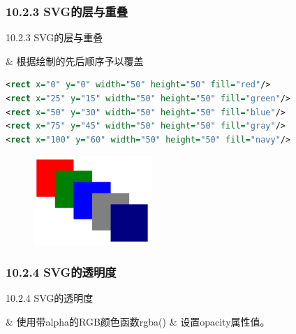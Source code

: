 \subsubsection{10.2.3 SVG的层与重叠}
\begin{frame}[fragile]{10.2.3 SVG的层与重叠}
\begin{easylist} \easyitem
& 根据绘制的先后顺序予以覆盖
\begin{lstlisting}[tabsize=8, basicstyle=\small\tt, language=XML]
<rect x="0" y="0" width="50" height="50" fill="red"/>
<rect x="25" y="15" width="50" height="50" fill="green"/>
<rect x="50" y="30" width="50" height="50" fill="blue"/>
<rect x="75" y="45" width="50" height="50" fill="gray"/>
<rect x="100" y="60" width="50" height="50" fill="navy"/>
\end{lstlisting}

\begin{figure}
    \includegraphics[width=0.4\textwidth]{figure/svg-overlapping.png}
\end{figure}
\end{easylist}
\end{frame}


\subsubsection{10.2.4 SVG的透明度}
\begin{frame}[fragile]{10.2.4 SVG的透明度}
\begin{easylist} \easyitem
& 使用带alpha的RGB颜色函数rgba()
& 设置opacity属性值。
\end{easylist}
\end{frame}


